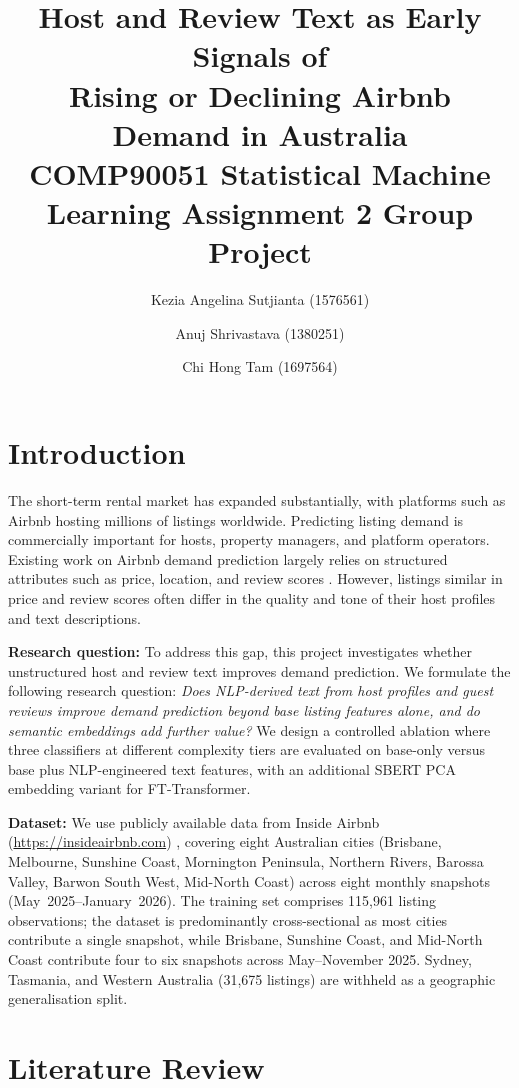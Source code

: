 \documentclass[10pt,a4paper]{article}
\title{\textbf{Host and Review Text as Early Signals of\\
Rising or Declining Airbnb Demand in Australia}\\[0.4em]
\large COMP90051 Statistical Machine Learning Assignment 2 Group Project}
\author{Kezia Angelina Sutjianta (1576561) \and Anuj Shrivastava (1380251) \and Chi Hong Tam (1697564)}
\date{}
\begin{document}
\maketitle
\section{Introduction}

The short-term rental market has expanded substantially, with platforms such as
Airbnb hosting millions of listings worldwide. Predicting listing demand is
commercially important for hosts, property managers, and platform operators.
Existing work on Airbnb demand prediction largely relies on structured attributes
such as price, location, and review scores \cite{rezazadeh2021}. However,
listings similar in price and review scores often differ in the quality and tone
of their host profiles and text descriptions.

\textbf{Research question:} To address this gap, this project investigates
whether unstructured host and review text improves demand prediction. We formulate
the following research question: \textit{Does NLP-derived text from host profiles and
guest reviews improve demand prediction beyond base listing features alone, and
do semantic embeddings add further value?} We design a controlled ablation where
three classifiers at different complexity tiers are evaluated on base-only versus
base plus NLP-engineered text features, with an additional SBERT PCA embedding
variant for FT-Transformer.

\textbf{Dataset:} We use publicly available data from Inside Airbnb
(\url{https://insideairbnb.com}) \cite{insideairbnb}, covering eight Australian
cities (Brisbane, Melbourne, Sunshine Coast, Mornington Peninsula, Northern
Rivers, Barossa Valley, Barwon South West, Mid-North Coast) across eight monthly
snapshots (May~2025--January~2026). The training set comprises 115{,}961 listing
observations; the dataset is predominantly cross-sectional as most cities
contribute a single snapshot, while Brisbane, Sunshine Coast, and Mid-North Coast
contribute four to six snapshots across May--November 2025. Sydney, Tasmania, and
Western Australia (31{,}675 listings) are withheld as a geographic
generalisation split.

\section{Literature Review}
\end{document}
